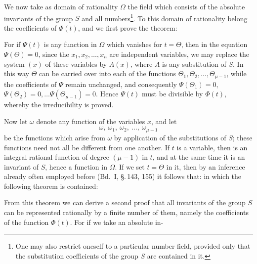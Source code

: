 We now take as domain of rationality $\Omega$ the field which
consists of the absolute invariants of the group $S$ and all
numbers\footnote{One may also restrict oneself to a particular number field, provided only that the substitution coefficients of the group $S$ are contained in it.}. To this domain of rationality belong the coefficients
of $\Phi(t)$, and we first prove the theorem:


For if $\Psi(t)$ is any function in $\Omega$ which vanishes for $t = \Theta$,
then in the equation $\Psi(\Theta) = 0$, since
the $x_1, x_2, \dots, x_n$ are independent variables, we may replace the system $(x)$
of these variables by $A(x)$, where $A$ is any substitution
of $S$. In this way $\Theta$ can be carried over into each of the functions
$\Theta_1, \Theta_2, \dots, \Theta_{\mu-1}$, while the coefficients
of $\Psi$ remain unchanged, and consequently $\Psi(\Theta_1) = 0$,
$\Psi(\Theta_2) = 0, \dots \Psi(\Theta_{\mu-1}) = 0$. Hence $\Psi(t)$ must be divisible by $\Phi(t)$,
whereby the irreducibility is proved.

Now let $\omega$ denote any function of the variables $x$, and let
\[ \omega,\ \omega_1,\ \omega_2,\ \dots,\ \omega_{\mu-1} \]
be the functions which arise from $\omega$ by application of the
substitutions of $S$; these functions need not all be different from one another.
If $t$ is a variable, then
is an integral rational function of degree $(\mu-1)$ in $t$, and at the same time
it is an invariant of $S$, hence a function in $\Omega$.
If we set $t = \Theta$ in it, then by an inference already often
employed before (Bd.\ I, \S.\,143, 155) it follows that:
in which the following theorem is contained:


From this theorem we can derive a second proof
that all invariants of the group $S$ can be represented rationally by a
finite number of them, namely the coefficients of the function
$\Phi(t)$. For if we take an absolute in-
